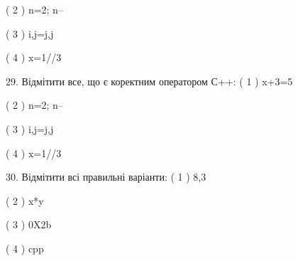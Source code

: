 \documentclass[11pt]{article}
\begin{document}
( 2 ) n=2; n--

( 3 ) i,j=j,j

( 4 ) x=1//3

29. Відмітити все, що є коректним оператором С++:
( 1 ) x+3=5

( 2 ) n=2; n--

( 3 ) i,j=j,j

( 4 ) x=1//3

30. Відмітити всі правильні варіанти:
( 1 ) 8,3

( 2 ) x*y

( 3 ) 0X2b

( 4 ) cpp































\newpage
\end{document}

